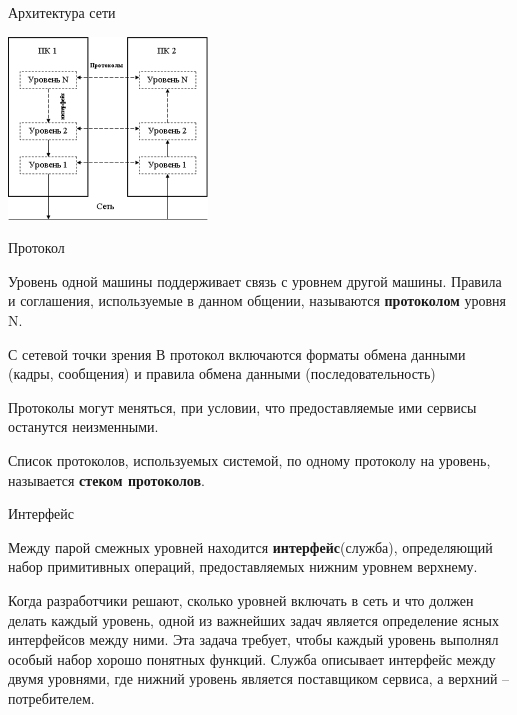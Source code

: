 \begin{frame}{Архитектура сети}
	\begin{center}
	\includegraphics[width=200px]{01-proto_interface.png}
	\end{center}
\end{frame}

\begin{frame}{Протокол}
	\begin{center}
Уровень одной машины поддерживает связь с уровнем другой машины. 
Правила и соглашения, используемые в данном общении,  называются {\bfseries протоколом} уровня N.
	\end{center}
	\begin{center}
С сетевой точки зрения В протокол включаются форматы обмена данными (кадры,  сообщения) и правила обмена данными (последовательность)
	\end{center}
	\begin{center}
Протоколы могут меняться,  при условии,  что предоставляемые ими сервисы останутся неизменными.
	\end{center}
	\begin{center}
		Список протоколов,  используемых системой,  по одному протоколу на уровень,  называется {\bfseries стеком протоколов}.
	\end{center}
\end{frame}

\begin{frame}{Интерфейс}
	\begin{center}
		Между парой смежных уровней находится {\bfseries интерфейс}(служба),  определяющий набор примитивных операций,  предоставляемых нижним уровнем верхнему.
	\end{center}
	\begin{center}
	Когда разработчики решают,  сколько уровней включать в сеть и что должен делать каждый уровень,  одной из важнейших задач является определение ясных интерфейсов между ними. Эта задача требует,  чтобы каждый уровень выполнял особый набор хорошо понятных функций. Служба описывает интерфейс между двумя уровнями, где нижний уровень является поставщиком сервиса, а верхний – потребителем.
	\end{center}
\end{frame}

